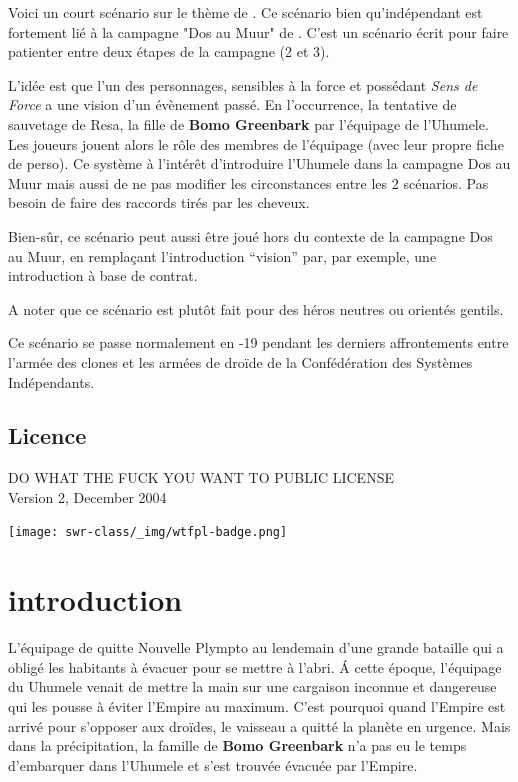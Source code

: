 \documentclass{jdrp}
\begin{document}
	Voici un court scénario sur le thème de . Ce scénario bien qu’indépendant est fortement lié à la campagne "Dos au Muur" de . C’est un scénario écrit pour faire patienter entre deux étapes de la campagne (2 et 3). 

	L’idée est que l’un des personnages, sensibles à la force et possédant \textit{Sens de Force} a une vision d’un évènement passé. En l’occurrence, la tentative de sauvetage de Resa, la fille de \textbf{Bomo Greenbark} par l'équipage de l’Uhumele. Les joueurs jouent alors le rôle des membres de l’équipage (avec leur propre fiche de perso). Ce système à l’intérêt d’introduire l’Uhumele dans la campagne Dos au Muur mais aussi de ne pas modifier les circonstances entre les 2 scénarios. Pas besoin de faire des raccords tirés par les cheveux.

	Bien-sûr, ce scénario peut aussi être joué hors du contexte de la campagne Dos au Muur, en remplaçant l’introduction “vision” par, par exemple, une introduction à base de contrat.

	A noter que ce scénario est plutôt fait pour des héros neutres ou orientés gentils.

	Ce scénario se passe normalement en -19 pendant les derniers affrontements entre l’armée des clones et les armées de droïde de la Confédération des Systèmes Indépendants.

	\subsection{Licence}
	\noindent DO WHAT THE FUCK YOU WANT TO PUBLIC LICENSE\\
    Version 2, December 2004
    \vspace{-2.5\baselineskip}
	\begin{flushright}
		\texttt{[image: swr-class/\_img/wtfpl-badge.png]}
	\end{flushright}

	\twocolumn

	\section{introduction}
	L’équipage de  quitte Nouvelle Plympto au lendemain d’une grande bataille qui a obligé les habitants à évacuer pour se mettre à l’abri. \'A cette époque, l’équipage du Uhumele venait de mettre la main sur une cargaison inconnue et dangereuse qui les pousse à éviter l’Empire au maximum. C’est pourquoi quand l’Empire est arrivé pour s’opposer aux droïdes, le vaisseau a quitté la planète en urgence. Mais dans la précipitation, la famille de \textbf{Bomo Greenbark} n’a pas eu le temps d’embarquer dans l’Uhumele et s’est trouvée évacuée par l’Empire.
\end{document}
